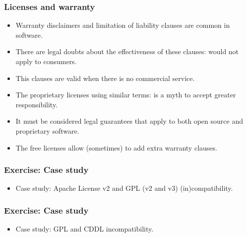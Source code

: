 
\begin{frame}
\frametitle{Licenses and warranty}

\begin{itemize}
\item Warranty disclaimers and limitation of liability clauses are common in software.
\item There are legal doubts about the effectiveness of these clauses: \alert{would not apply to consumers}.
\item This clauses are valid when there is \alert{no commercial service}.
\item The proprietary licenses using similar terms: is a myth to accept greater responsibility.
\item It must be considered legal guarantees that apply to both open source and proprietary software.
\item The free licenses allow (sometimes) to add extra warranty clauses.
\end{itemize}


\end{frame}


\begin{frame}
\frametitle{Exercise: Case study}


\begin{itemize}
\item Case study: Apache License v2 and GPL (v2 and v3)  (in)compatibility.
\end{itemize}

\end{frame}



\begin{frame}
\frametitle{Exercise: Case study}


\begin{itemize}
\item Case study: GPL and CDDL incompatibility.
\end{itemize}

\end{frame}


